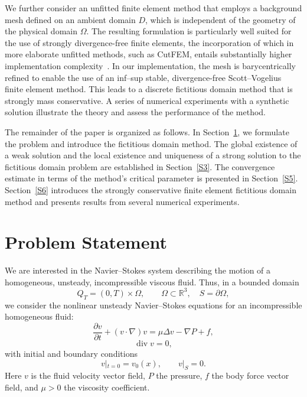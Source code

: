 \documentclass[11pt]{article}
\begin{document}
We further consider an unfitted finite element method that employs a background mesh defined on an ambient domain $D$, which is independent of the geometry of the physical domain $\Omega$.
{The resulting formulation is particularly well suited for the use of strongly divergence-free finite elements, the incorporation of which in more elaborate unfitted methods, such as CutFEM, entails substantially higher implementation complexity~\cite{neilan2025unfitted}}.
In our implementation, the mesh is barycentrically refined to enable the use of an inf–sup stable, divergence-free Scott–Vogelius finite element method. This leads to a discrete fictitious domain method that is strongly mass conservative. A series of numerical experiments with a synthetic solution illustrate the theory and assess the performance of the method.

%

The remainder of the paper is organized as follows. In Section~\ref{S2}, we formulate the problem and introduce the fictitious domain method. The global existence of a weak solution and the local existence and uniqueness of a strong solution to the fictitious domain problem are established in Section~\ref{S3}. The convergence estimate in terms of the method's critical parameter is presented in Section~\ref{S5}. Section~\ref{S6} introduces the strongly conservative finite element fictitious domain method and presents results from several numerical experiments.


\section{Problem Statement}\label{S2}

We are interested in the Navier--Stokes system describing the motion of a homogeneous, unsteady, incompressible viscous fluid. Thus, in a bounded domain 
\[
Q_T = (0,T)\times\Omega, \qquad \Omega \subset \mathbb{R}^3, \quad S = \partial\Omega,
\] 
we consider the nonlinear unsteady Navier--Stokes equations for an incompressible homogeneous fluid:
\begin{equation} \label{St 1}
	\frac{\partial v}{\partial t} + (v\cdot\nabla)v = \mu\Delta v - \nabla P + f,
\end{equation}
\begin{equation} \label{St 2}
	\operatorname{div} v=0,
\end{equation}
with initial and boundary conditions
\begin{equation} \label{St 3}
	v|_{t=0} = v_0(x),\qquad v|_{S} = 0.
\end{equation}
Here $v$ is the fluid velocity vector field, $P$ the pressure, $f$ the body force vector field, and $\mu>0$ the viscosity coefficient. 
\end{document}
